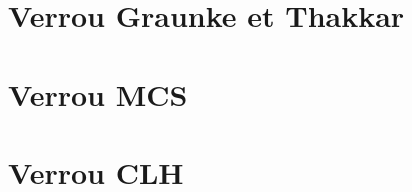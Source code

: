 \documentclass[11pt,a4paper]{report}
\begin{document}

\section{Verrou Graunke et Thakkar} %
\label{sec:Verrou Graunke et Thakkar}


\section{Verrou MCS} %
\label{sec:Verrou MCS}


\section{Verrou CLH} %
\label{sec:Verrou CLH}


\end{document}
